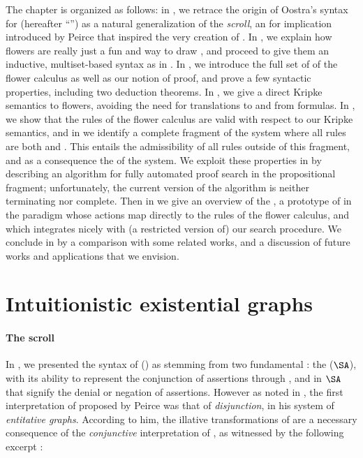 \begin{scope}
The chapter is organized as follows: in , we retrace the origin of
Oostra's syntax for   (hereafter ``'') as a
natural generalization of the \emph{scroll}, an  for implication introduced
by Peirce that inspired the very creation of . In , we
explain how flowers are really just a fun and  way to draw
, and proceed to give them an inductive, multiset-based syntax as in
. In , we introduce the full set of  of the flower calculus as well as our notion of proof, and prove a few
syntactic properties, including two deduction theorems. In ,
we give a direct Kripke semantics to flowers, avoiding the need for translations
to and from formulas. In , we show that the rules of the
flower calculus are valid with respect to our Kripke semantics, and in
 we identify a complete fragment of the system where all
rules are both \emph{} and \emph{}. This entails the
admissibility of all rules outside of this fragment, and as a consequence the
 of the system. We exploit these properties in
 by describing an algorithm for fully automated proof
search in the propositional fragment; unfortunately, the current version of the
algorithm is neither terminating nor complete. Then in 
we give an overview of the , a prototype of  in the
 paradigm whose actions map directly to the rules of the flower
calculus, and which integrates nicely with (a restricted version of) our search
procedure. We conclude in  by a comparison with some related
works, and a discussion of future works and applications that we envision.


\section{Intuitionistic existential graphs}

\paragraph{The scroll}

In , we presented the syntax of  () as
stemming from two fundamental : the  ($\SA$),
with its ability to represent the conjunction of assertions through
\emph{}, and \emph{} in $\SA$ that signify the denial or
negation of assertions. However as noted in , the first
interpretation of  proposed by Peirce was that of
\emph{disjunction}, in his system of \emph{entitative graphs}. According to him,
the illative transformations of  are a necessary consequence of the
\emph{conjunctive} interpretation of , as witnessed by the
following excerpt :


\end{scope}
